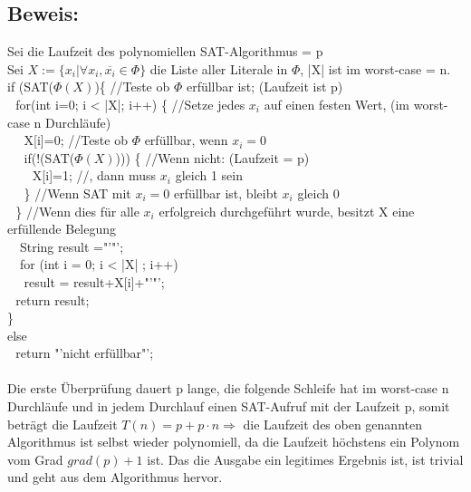 \documentclass[a4paper,11pt,twoside]{article}
\begin{document}
\subsection*{Beweis:}
Sei die Laufzeit des polynomiellen SAT-Algorithmus = p\\
Sei $X:=\{x_i| \forall x_i,\overline{x_i} \in \Phi\}$ die Liste aller Literale in $\Phi$, |X| ist im worst-case = n.\\
if (SAT($\Phi(X)$)\{  //Teste ob $\Phi$ erfüllbar ist; (Laufzeit ist p) \\
$~~~$for(int i=0; i < |X|; i++) \{  //Setze jedes $x_i$ auf einen festen Wert, (im worst-case n Durchläufe)\\
$~~~$$~~~$X[i]=0;  //Teste ob $\Phi$ erfüllbar, wenn $x_i=0$\\
$~~~$$~~~$if(!(SAT($\Phi(X)$))) \{ //Wenn nicht: (Laufzeit = p)\\
$~~~$$~~~$$~~~$X[i]=1; 	//, dann muss $x_i$ gleich 1 sein\\
$~~~$$~~~$\} //Wenn SAT mit $x_i=0$ erfüllbar ist, bleibt $x_i$ gleich 0 \\
$~~~$\} //Wenn dies für alle $x_i$ erfolgreich durchgeführt wurde, besitzt X eine erfüllende Belegung\\
$~~~$ String result ="'"';\\
$~~~$ for (int i = 0; i < |X| ; i++)\\
$~~~$$~~~$result = result+X[i]+"'"';\\
$~~~$return result;\\
\}\\
else\\
$~~~$return "'nicht erfüllbar"';\\
\\
Die erste Überprüfung dauert p lange, die folgende Schleife hat im worst-case n Durchläufe und in jedem Durchlauf einen SAT-Aufruf mit der Laufzeit p, somit beträgt die Laufzeit $T(n)=p+p\cdot n \Rightarrow$ die Laufzeit des oben genannten Algorithmus ist selbst wieder polynomiell, da die Laufzeit höchstens ein Polynom vom Grad $grad(p)+1$ ist. Das die Ausgabe ein legitimes Ergebnis ist, ist trivial und geht aus dem Algorithmus hervor.
\end{document}
